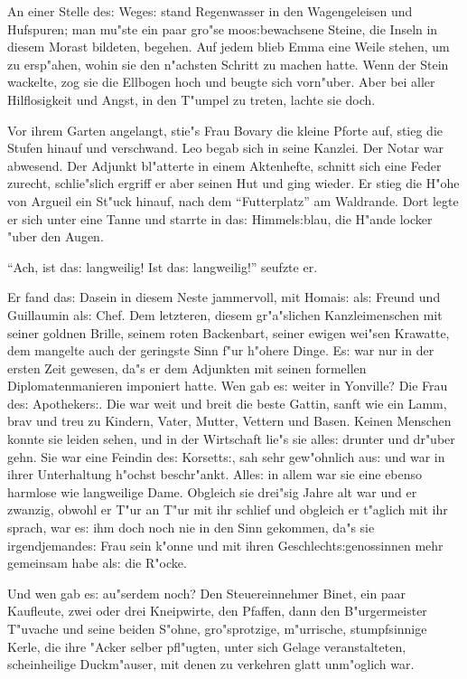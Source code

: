 \documentclass[oneside,12pt]{book}
\newcommand{\s}{s:}%
\begin{document}
An einer Stelle de{\s} Wege{\s} stand Regenwasser in den
Wagengeleisen und Hufspuren; man mu"ste ein paar gro"se
moo{\s}bewachsene Steine, die Inseln in diesem Morast bildeten,
begehen. Auf jedem blieb Emma eine Weile stehen, um zu ersp"ahen,
wohin sie den n"achsten Schritt zu machen hatte. Wenn der Stein
wackelte, zog sie die Ellbogen hoch und beugte sich vorn"uber.
Aber bei aller Hilflosigkeit und Angst, in den T"umpel zu treten,
lachte sie doch.

Vor ihrem Garten angelangt, stie"s Frau Bovary die kleine Pforte
auf, stieg die Stufen hinauf und verschwand. Leo begab sich in
seine Kanzlei. Der Notar war abwesend. Der Adjunkt bl"atterte in
einem Aktenhefte, schnitt sich eine Feder zurecht, schlie"slich
ergriff er aber seinen Hut und ging wieder. Er stieg die H"ohe von
Argueil ein St"uck hinauf, nach dem "`Futterplatz"' am Waldrande.
Dort legte er sich unter eine Tanne und starrte in da{\s}
Himmel{\s}blau, die H"ande locker "uber den Augen.

"`Ach, ist da{\s} langweilig! Ist da{\s} langweilig!"' seufzte er.

Er fand da{\s} Dasein in diesem Neste jammervoll, mit Homai{\s}
al{\s} Freund und Guillaumin al{\s} Chef. Dem letzteren, diesem
gr"a"slichen Kanzleimenschen mit seiner goldnen Brille, seinem
roten Backenbart, seiner ewigen wei"sen Krawatte, dem mangelte
auch der geringste Sinn f"ur h"ohere Dinge. E{\s} war nur in der
ersten Zeit gewesen, da"s er dem Adjunkten mit seinen formellen
Diplomatenmanieren imponiert hatte. Wen gab e{\s} weiter in
Yonville? Die Frau de{\s} Apotheker{\s}. Die war weit und breit
die beste Gattin, sanft wie ein Lamm, brav und treu zu Kindern,
Vater, Mutter, Vettern und Basen. Keinen Menschen konnte sie
leiden sehen, und in der Wirtschaft lie"s sie alle{\s} drunter und
dr"uber gehn. Sie war eine Feindin de{\s} Korsett{\s}, sah sehr
gew"ohnlich au{\s} und war in ihrer Unterhaltung h"ochst
beschr"ankt. Alle{\s} in allem war sie eine ebenso harmlose wie
langweilige Dame. Obgleich sie drei"sig Jahre alt war und er
zwanzig, obwohl er T"ur an T"ur mit ihr schlief und obgleich er
t"aglich mit ihr sprach, war e{\s} ihm doch noch nie in den Sinn
gekommen, da"s sie irgendjemande{\s} Frau sein k"onne und mit
ihren Geschlecht{\s}genossinnen mehr gemeinsam habe al{\s} die
R"ocke.

Und wen gab e{\s} au"serdem noch? Den Steuereinnehmer Binet, ein
paar Kaufleute, zwei oder drei Kneipwirte, den Pfaffen, dann den
B"urgermeister T"uvache und seine beiden S"ohne, gro"sprotzige,
m"urrische, stumpfsinnige Kerle, die ihre "Acker selber pfl"ugten,
unter sich Gelage veranstalteten, scheinheilige Duckm"auser, mit
denen zu verkehren glatt unm"oglich war.
\end{document}
